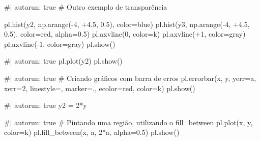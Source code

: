 \documentclass[
  letterpaper,
  DIV=11,
  numbers=noendperiod]{scrreprt}
\newenvironment{Shaded}{\begin{snugshade}}{\end{snugshade}}
\newcommand{\NormalTok}[1]{\textcolor[rgb]{0.00,0.23,0.31}{#1}}
\begin{document}
\begin{Shaded}
\begin{Highlighting}[]
\NormalTok{\#| autorun: true}
\NormalTok{\# Outro exemplo de transparência}

\NormalTok{pl.hist(y2, np.arange({-}4, +4.5, 0.5), color=\textquotesingle{}blue\textquotesingle{})}
\NormalTok{pl.hist(y3, np.arange({-}4, +4.5, 0.5), color=\textquotesingle{}red\textquotesingle{}, alpha=0.5) }
\NormalTok{pl.axvline(0, color=\textquotesingle{}k\textquotesingle{})}
\NormalTok{pl.axvline(+1, color=\textquotesingle{}gray\textquotesingle{})}
\NormalTok{pl.axvline({-}1, color=\textquotesingle{}gray\textquotesingle{})}
\NormalTok{pl.show()}
\end{Highlighting}
\end{Shaded}

\begin{Shaded}
\begin{Highlighting}[]
\NormalTok{\#| autorun: true}
\NormalTok{pl.plot(y2)}
\NormalTok{pl.show()}
\end{Highlighting}
\end{Shaded}

\begin{Shaded}
\begin{Highlighting}[]
\NormalTok{\#| autorun: true}
\NormalTok{\# Criando gráficos com barra de erros}
\NormalTok{pl.errorbar(x, y, yerr=a, xerr=2, linestyle=\textquotesingle{}\textquotesingle{}, marker=\textquotesingle{}.\textquotesingle{}, ecolor=\textquotesingle{}red\textquotesingle{}, color=\textquotesingle{}k\textquotesingle{})}
\NormalTok{pl.show()}
\end{Highlighting}
\end{Shaded}

\begin{Shaded}
\begin{Highlighting}[]
\NormalTok{\#| autorun: true}
\NormalTok{y2 = 2*y}
\end{Highlighting}
\end{Shaded}

\begin{Shaded}
\begin{Highlighting}[]
\NormalTok{\#| autorun: true}
\NormalTok{\# Pintando uma região, utilizando o fill\_between}
\NormalTok{pl.plot(x, y, color=\textquotesingle{}k\textquotesingle{})}
\NormalTok{pl.fill\_between(x, a, 2*a, alpha=0.5)}
\NormalTok{pl.show()}
\end{Highlighting}
\end{Shaded}
\end{document}
